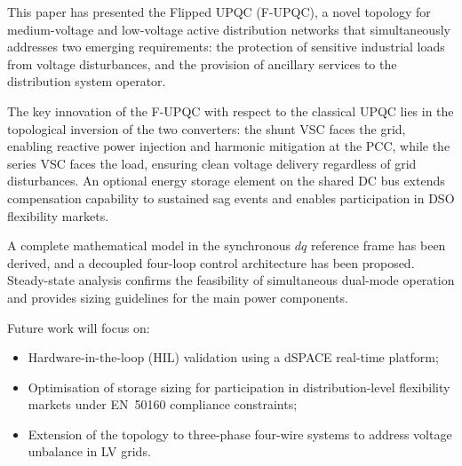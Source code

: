 \documentclass[conference]{IEEEtran}
\begin{document}
This paper has presented the Flipped UPQC (F-UPQC), a novel topology
for medium-voltage and low-voltage active distribution networks
that simultaneously addresses two emerging requirements: the
protection of sensitive industrial loads from voltage disturbances,
and the provision of ancillary services to the distribution system
operator.

The key innovation of the F-UPQC with respect to the classical UPQC
lies in the topological inversion of the two converters: the shunt VSC
faces the grid, enabling reactive power injection and harmonic
mitigation at the PCC, while the series VSC faces the load, ensuring
clean voltage delivery regardless of grid disturbances.
An optional energy storage element on the shared DC bus extends
compensation capability to sustained sag events and enables
participation in DSO flexibility markets.

A complete mathematical model in the synchronous $dq$ reference frame
has been derived, and a decoupled four-loop control architecture has
been proposed. Steady-state analysis confirms the feasibility of
simultaneous dual-mode operation and provides sizing guidelines for
the main power components.

Future work will focus on:
\begin{itemize}
  \item Hardware-in-the-loop (HIL) validation using a dSPACE
        real-time platform;
  \item Optimisation of storage sizing for participation in
        distribution-level flexibility markets under EN~50160
        compliance constraints;
  \item Extension of the topology to three-phase four-wire systems
        to address voltage unbalance in LV grids.
\end{itemize}



\end{document}
